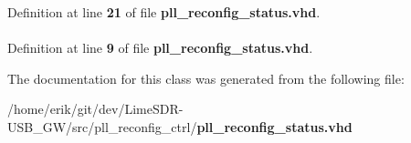 Definition at line {\bf 21} of file {\bf pll\+\_\+reconfig\+\_\+status.\+vhd}.

\paragraph[{std\+\_\+logic\+\_\+1164}]{\hspace{0.3cm}{\ttfamily [Package]}}\label{classpll__reconfig__status_acd03516902501cd1c7296a98e22c6fcb}


Definition at line {\bf 9} of file {\bf pll\+\_\+reconfig\+\_\+status.\+vhd}.



The documentation for this class was generated from the following file\+:\begin{DoxyCompactItemize}
\item 
/home/erik/git/dev/\+Lime\+S\+D\+R-\/\+U\+S\+B\+\_\+\+G\+W/src/pll\+\_\+reconfig\+\_\+ctrl/{\bf pll\+\_\+reconfig\+\_\+status.\+vhd}\end{DoxyCompactItemize}
